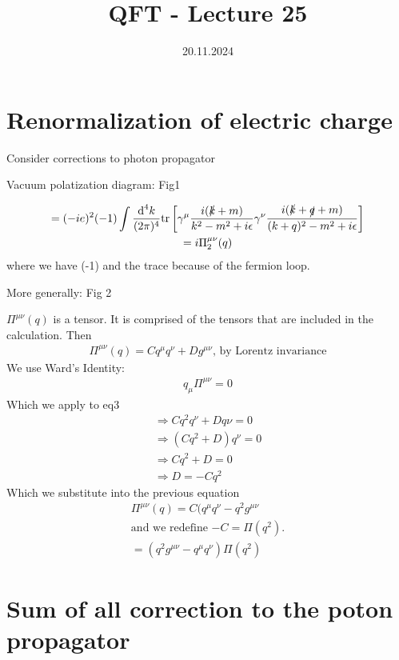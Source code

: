 \documentclass[]{scrartcl}
\title{QFT - Lecture 25}
\author{}
\date{20.11.2024}
\begin{document}
\maketitle
\newpage
\tableofcontents
\newpage

\section{Renormalization of electric charge} 

Consider corrections to photon propagator

Vacuum polatization diagram: Fig1

\begin{gather}
	= (-ie)^2 (-1) \int\frac{\text d^4k}{(2\pi)^4}\text{tr}\left[\gamma^\mu \frac{i(\slashed k + m)}{k^2 - m^2 + i\epsilon} \gamma^\nu \frac{i(\slashed k + \slashed q + m)}{(k+q)^2 - m^2 + i\epsilon}\right]\\
	= i \Pi_2^{\mu\nu}(q)
\end{gather}
where we have (-1) and the trace because of the fermion loop.

More generally: Fig 2

$\Pi^{\mu\nu}(q)$ is a tensor. It is comprised of the tensors that are included in the calculation. Then
\begin{gather}
	\Pi^{\mu\nu}(q) = Cq^\mu q^\nu + D g^{\mu\nu}\text{, by Lorentz invariance}
\end{gather}
We use Ward's Identity:
\begin{gather}
	q_\mu \Pi^{\mu\nu} = 0
\end{gather}
Which we apply to eq3
\begin{gather}
	\Rightarrow Cq^2q^\nu + Dq\nu = 0\\
	\Rightarrow (Cq^2 + D) q^\nu =  0\\
	\Rightarrow Cq^2 + D = 0\\
	\Rightarrow D = -Cq^2
\end{gather}
Which we substitute into the previous equation
\begin{gather}
	\Pi^{\mu\nu}(q) = C(q^\mu q^\nu - q^2 g^{\mu\nu}\\
	\text{and we redefine $-C = \Pi(q^2)$.} \nonumber\\
	= (q^2 g^{\mu\nu} - q^\mu q^\nu)\Pi(q^2)
\end{gather}

\section{Sum of all correction to the poton propagator}
\end{document}

